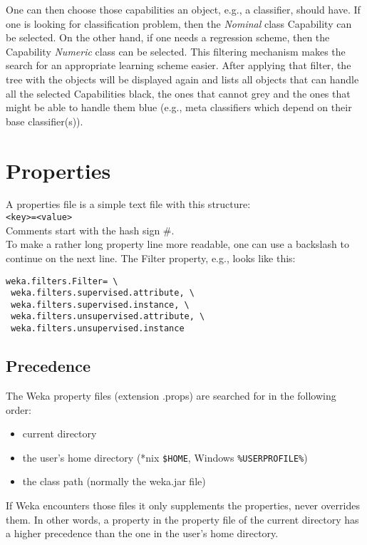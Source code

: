 \noindent One can then choose those capabilities an object, e.g., a
classifier, should have. If one is looking for classification problem,
then the \textit{Nominal} class Capability can be selected. On the other hand,
if one needs a regression scheme, then the Capability \textit{Numeric} class
can be selected. This filtering mechanism makes the search for an
appropriate learning scheme easier. After applying that filter, the
tree with the objects will be displayed again and lists all objects
that can handle all the selected Capabilities black, the ones that
cannot grey and the ones that might be able to handle them blue (e.g.,
meta classifiers which depend on their base classifier(s)).

\newpage
\section{Properties}
A properties file is a simple text file with this structure:\\

\verb^<key>=<value>^\\

\noindent Comments start with the hash sign \#.\\

\noindent To make a rather long property line more readable, one can
use a backslash to continue on the next line. The Filter property,
e.g., looks like this:

\begin{verbatim}
weka.filters.Filter= \
 weka.filters.supervised.attribute, \
 weka.filters.supervised.instance, \
 weka.filters.unsupervised.attribute, \
 weka.filters.unsupervised.instance
\end{verbatim}

\subsection{Precedence}
The Weka property files (extension .props) are searched for in the following order:

\begin{itemize}
\item current directory
\item the user's home directory (*nix \verb=$HOME=, Windows \verb=%USERPROFILE%=)
\item the class path (normally the weka.jar file) 
\end{itemize}

\noindent If Weka encounters those files it only supplements the
properties, never overrides them. In other words, a property in the
property file of the current directory has a higher precedence than
the one in the user's home directory.\\

